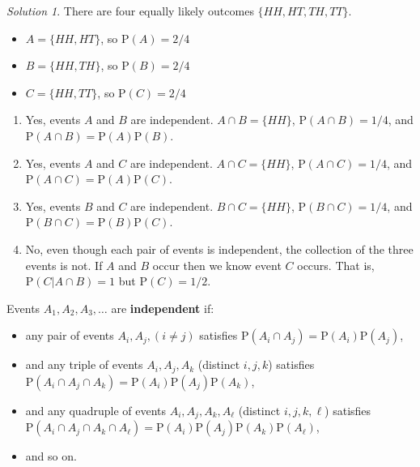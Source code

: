 \documentclass[
  letterpaper,
  DIV=11,
  numbers=noendperiod]{scrreprt}
\providecommand{\tightlist}{%
  \setlength{\itemsep}{0pt}\setlength{\parskip}{0pt}}
\theoremstyle{plain}
\theoremstyle{definition}
\theoremstyle{definition}
\theoremstyle{definition}
\theoremstyle{remark}
\newtheorem{refsolution}{Solution}[chapter]
\begin{document}
\begin{tcolorbox}[enhanced jigsaw, opacityback=0, rightrule=.15mm, coltitle=black, colframe=quarto-callout-tip-color-frame, toprule=.15mm, colbacktitle=quarto-callout-tip-color!10!white, opacitybacktitle=0.6, left=2mm, toptitle=1mm, breakable, title={Solution (click to expand)}, bottomtitle=1mm, colback=white, leftrule=.75mm, titlerule=0mm, arc=.35mm, bottomrule=.15mm]

\begin{refsolution}
There are four equally likely outcomes \(\{HH, HT, TH, TT\}\).

\begin{itemize}
\tightlist
\item
  \(A = \{HH, HT\}\), so \(\textrm{P}(A) = 2/4\)
\item
  \(B = \{HH, TH\}\), so \(\textrm{P}(B) = 2/4\)
\item
  \(C = \{HH, TT\}\), so \(\textrm{P}(C) = 2/4\)
\end{itemize}

\begin{enumerate}
\def\labelenumi{\arabic{enumi}.}
\tightlist
\item
  Yes, events \(A\) and \(B\) are independent. \(A\cap B=\{HH\}\),
  \(\textrm{P}(A\cap B)=1/4\), and
  \(\textrm{P}(A\cap B)=\textrm{P}(A)\textrm{P}(B)\).
\item
  Yes, events \(A\) and \(C\) are independent. \(A\cap C=\{HH\}\),
  \(\textrm{P}(A\cap C)=1/4\), and
  \(\textrm{P}(A\cap C)=\textrm{P}(A)\textrm{P}(C)\).
\item
  Yes, events \(B\) and \(C\) are independent. \(B\cap C=\{HH\}\),
  \(\textrm{P}(B\cap C)=1/4\), and
  \(\textrm{P}(B\cap C)=\textrm{P}(B)\textrm{P}(C)\).
\item
  No, even though each pair of events is independent, the collection of
  the three events is not. If \(A\) and \(B\) occur then we know event
  \(C\) occurs. That is, \(\textrm{P}(C|A \cap B)=1\) but
  \(\textrm{P}(C) = 1/2\).
\end{enumerate}

\label{sol-coin-multiple-events-independent}

\end{refsolution}

\end{tcolorbox}

Events \(A_1, A_2, A_3, \ldots\) are \textbf{independent} if:

\begin{itemize}
\tightlist
\item
  any pair of events \(A_i, A_j, (i \neq j)\) satisfies
  \(\textrm{P}(A_i\cap A_j)=\textrm{P}(A_i)\textrm{P}(A_j)\),
\item
  and any triple of events \(A_i, A_j, A_k\) (distinct \(i,j,k\))
  satisfies
  \(\textrm{P}(A_i\cap A_j\cap A_k)=\textrm{P}(A_i)\textrm{P}(A_j)\textrm{P}(A_k)\),
\item
  and any quadruple of events \(A_i, A_j, A_k, A_\ell\) (distinct
  \(i,j,k,\ell\)) satisfies
  \(\textrm{P}(A_i\cap A_j\cap A_k \cap A_\ell)=\textrm{P}(A_i)\textrm{P}(A_j)\textrm{P}(A_k)\textrm{P}(A_\ell)\),
\item
  and so on.
\end{itemize}
\end{document}
